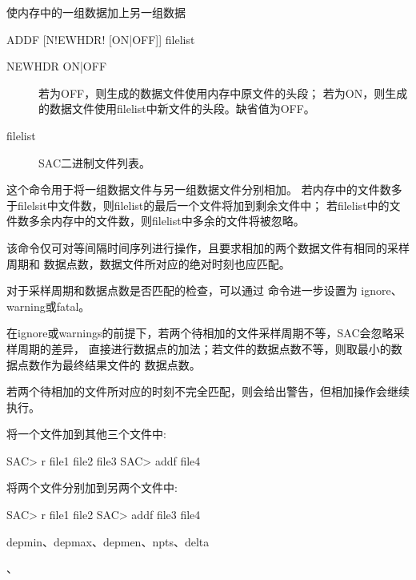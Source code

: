 \label{cmd:addf}

使内存中的一组数据加上另一组数据

\begin{SACSTX}
ADDF [N!EWHDR! [ON|OFF]] filelist
\end{SACSTX}

\begin{description}
\item [NEWHDR ON|OFF] 若为OFF，则生成的数据文件使用内存中原文件的头段；
    若为ON，则生成的数据文件使用filelist中新文件的头段。缺省值为OFF。
\item [filelist] SAC二进制文件列表。
\end{description}

这个命令用于将一组数据文件与另一组数据文件分别相加。
若内存中的文件数多于filelsit中文件数，则filelist的最后一个文件将加到剩余文件中；
若filelist中的文件数多余内存中的文件数，则filelist中多余的文件将被忽略。

该命令仅可对等间隔时间序列进行操作，且要求相加的两个数据文件有相同的采样周期和
数据点数，数据文件所对应的绝对时刻也应匹配。

对于采样周期和数据点数是否匹配的检查，可以通过  命令进一步设置为
ignore、warning或fatal。

在ignore或warnings的前提下，若两个待相加的文件采样周期不等，SAC会忽略采样周期的差异，
直接进行数据点的加法；若文件的数据点数不等，则取最小的数据点数作为最终结果文件的
数据点数。

若两个待相加的文件所对应的时刻不完全匹配，则会给出警告，但相加操作会继续执行。

将一个文件加到其他三个文件中:
\begin{SACCode}
SAC> r file1 file2 file3
SAC> addf file4
\end{SACCode}

将两个文件分别加到另两个文件中:
\begin{SACCode}
SAC> r file1 file2
SAC> addf file3 file4
\end{SACCode}

depmin、depmax、depmen、npts、delta

、
